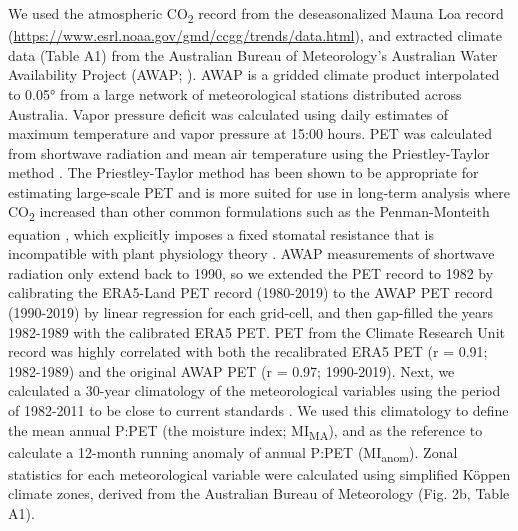 \documentclass[gc, manuscript]{copernicus}
\begin{document}
We used the atmospheric CO\textsubscript{2} record from the
deseasonalized Mauna Loa record
(\url{https://www.esrl.noaa.gov/gmd/ccgg/trends/data.html}), and
extracted climate data (Table A1) from the Australian Bureau of
Meteorology's Australian Water Availability Project (AWAP;
\citet{jonesHighqualitySpatialClimate2009}). AWAP is a gridded climate
product interpolated to 0.05° from a large network of meteorological
stations distributed across Australia. Vapor pressure deficit was
calculated using daily estimates of maximum temperature and vapor
pressure at 15:00 hours. PET was calculated from shortwave radiation and
mean air temperature using the Priestley-Taylor method
\citep{davisSimpleProcessledAlgorithms2017}. The Priestley-Taylor method
has been shown to be appropriate for estimating large-scale PET
\citep{raupachEquilibriumEvaporationConvective2000} and is more suited
for use in long-term analysis where CO\textsubscript{2} increased than
other common formulations such as the Penman-Monteith equation
\citep{greveAridityIndexGlobal2019, milly_dunne16}, which explicitly
imposes a fixed stomatal resistance that is incompatible with plant
physiology theory \citep{medlyn_etal01}. AWAP measurements of shortwave
radiation only extend back to 1990, so we extended the PET record to
1982 by calibrating the ERA5-Land PET record (1980-2019) to the AWAP PET
record (1990-2019) by linear regression for each grid-cell, and then
gap-filled the years 1982-1989 with the calibrated ERA5 PET. PET from
the Climate Research Unit record \citep{harris_etal14} was highly
correlated with both the recalibrated ERA5 PET (r = 0.91; 1982-1989) and
the original AWAP PET (r = 0.97; 1990-2019). Next, we calculated a
30-year climatology of the meteorological variables using the period of
1982-2011 to be close to current standards
\citep{worldmeteorologicalorganizationWMOGuidelinesCalculation2017}. We
used this climatology to define the mean annual P:PET (the moisture
index; MI\textsubscript{MA}), and as the reference to calculate a
12-month running anomaly of annual P:PET (MI\textsubscript{anom}). Zonal
statistics for each meteorological variable were calculated using
simplified Köppen climate zones, derived from the Australian Bureau of
Meteorology (Fig. 2b, Table A1).
\end{document}

